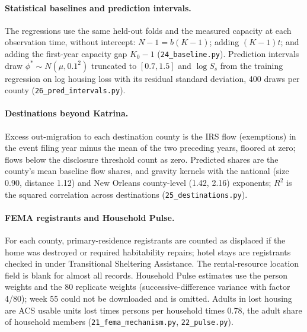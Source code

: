 \documentclass[11pt]{article}
\begin{document}
\paragraph{Statistical baselines and prediction intervals.} The regressions use the same held-out folds and the measured capacity at each observation time, without intercept: $N-1=b(K-1)$; adding $(K-1)t$; and adding the first-year capacity gap $K_0-1$ (\texttt{24\_baseline.py}). Prediction intervals draw $\phi^*\sim N(\mu,0.1^2)$ truncated to $[0.7,1.5]$ and $\log S_s$ from the training regression on log housing loss with its residual standard deviation, 400 draws per county (\texttt{26\_pred\_intervals.py}).

\paragraph{Destinations beyond Katrina.} Excess out-migration to each destination county is the IRS flow (exemptions) in the event filing year minus the mean of the two preceding years, floored at zero; flows below the disclosure threshold count as zero. Predicted shares are the county's mean baseline flow shares, and gravity kernels with the national (size 0.90, distance 1.12) and New Orleans county-level (1.42, 2.16) exponents; $R^2$ is the squared correlation across destinations (\texttt{25\_destinations.py}).

\paragraph{FEMA registrants and Household Pulse.} For each county, primary-residence registrants are counted as displaced if the home was destroyed or required habitability repairs; hotel stays are registrants checked in under Transitional Sheltering Assistance. The rental-resource location field is blank for almost all records. Household Pulse estimates use the person weights and the 80 replicate weights (successive-difference variance with factor 4/80); week 55 could not be downloaded and is omitted. Adults in lost housing are ACS usable units lost times persons per household times 0.78, the adult share of household members (\texttt{21\_fema\_mechanism.py}, \texttt{22\_pulse.py}).
\end{document}

